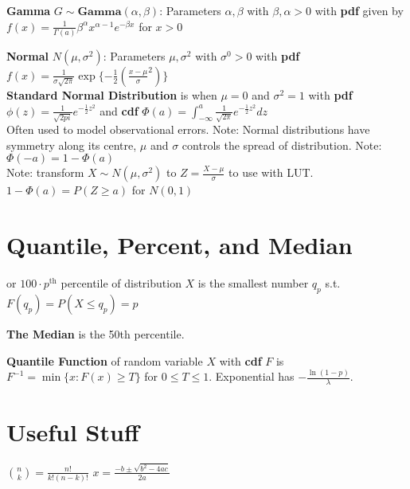 \documentclass[5pt]{article}
\begin{document}
\begin{definition}
\textbf{Gamma} $G \sim \textbf{Gamma}(\alpha, \beta)$: Parameters $\alpha, \beta$ with $\beta, \alpha > 0$ with \textbf{pdf} given by $f(x)=\frac{1}{\Gamma(a)}\beta^\alpha x^{\alpha - 1} e^{-\beta x}$ for $x>0$\\
\end{definition}

\begin{definition}
\textbf{Normal} $N(\mu, \sigma^2)$: Parameters $\mu, \sigma^2$ with $\sigma^0 > 0$ with \textbf{pdf} $f(x)=\frac{1}{\sigma\sqrt{2\pi}}\exp{\{-\frac{1}{2}(\frac{x-\mu}{\sigma}^2)\}}$\\
\textbf{Standard Normal Distribution} is when $\mu = 0$ and $\sigma^2 = 1$ with \textbf{pdf} $\phi(z) = \frac{1}{\sqrt{2pi}}e^{-\frac{1}{2}z^2}$ and \textbf{cdf} $\Phi(a) = \int^a_{-\infty}\frac{1}{\sqrt{2\pi}}e^{-\frac{1}{2}z^2}dz$\\
Often used to model observational errors. Note: Normal distributions have symmetry along its centre, $\mu$ and $\sigma$ controls the spread of distribution. Note: $\Phi (-a) = 1-\Phi(a)$\\
Note: transform $X \sim N(\mu, \sigma^2)$ to $Z = \frac{X-\mu}{\sigma}$ to use with LUT. $1-\Phi(a) = P(Z\geq a)$ for $N(0,1)$
\end{definition}

\section{Quantile, Percent, and Median}
\begin{definition}
 or $100 \cdot p^\text{th}$ percentile of distribution $X$ is the smallest number $q_p$ s.t. $F(q_p) = P(X\leq q_p) = p$
\end{definition}

\begin{definition}
\textbf{The Median} is the 50th percentile.
\end{definition}

\begin{definition}
\textbf{Quantile Function} of random variable $X$ with \textbf{cdf} $F$ is $F^{-1}=\min{\{x: F(x) \geq T\}}$ for $0\leq T \leq 1$. Exponential has $-\frac{\ln(1-p)}{\lambda}$.
\end{definition}
\section{Useful Stuff}
${n \choose k} = \frac{n!}{k!(n-k)!}$ \qquad $x=\frac{-b\pm\sqrt{b^2-4ac}}{2a}$
\end{document}

